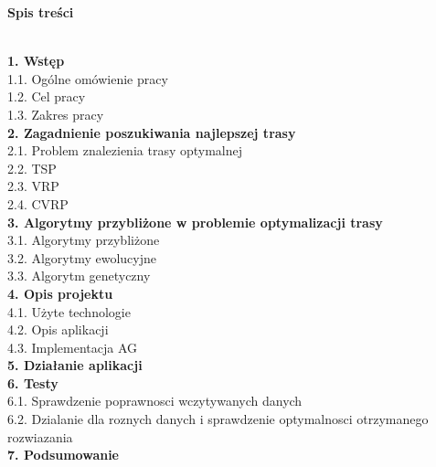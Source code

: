 \documentclass[a4paper, twoside, 12pt, justified]{article}
\begin{document}
	\begin{flushleft}
		\begin{large}\textbf{Spis treści}\end{large}
		\vspace{5mm}\\
		\textbf{1. Wstęp }\\
			\hspace{5mm}1.1. Ogólne omówienie pracy\\
			\hspace{5mm}1.2. Cel pracy\\
			\hspace{5mm}1.3. Zakres pracy\\
		\textbf{2. Zagadnienie poszukiwania najlepszej trasy }\\
			\hspace{5mm}2.1. Problem znalezienia trasy optymalnej\\
			\hspace{5mm}2.2. TSP\\
			\hspace{5mm}2.3. VRP\\
			\hspace{5mm}2.4. CVRP\\
		\textbf{3. Algorytmy przybliżone w problemie
			optymalizacji trasy }\\
			\hspace{5mm}3.1. Algorytmy przybliżone\\
			\hspace{5mm}3.2. Algorytmy ewolucyjne\\
			\hspace{5mm}3.3. Algorytm genetyczny\\
		\textbf{4. Opis projektu}\\
			\hspace{5mm}4.1. Użyte technologie\\
			\hspace{5mm}4.2. Opis aplikacji\\
			\hspace{5mm}4.3. Implementacja AG\\
		\textbf{5. Działanie aplikacji}\\
		\textbf{6. Testy}\\
			\hspace{5mm}6.1. Sprawdzenie poprawnosci wczytywanych danych\\
			\hspace{5mm}6.2. Dzialanie dla roznych danych i sprawdzenie optymalnosci otrzymanego rozwiazania\\
		\textbf{7. Podsumowanie}\\
		
	\end{flushleft}
	\newpage
	
\end{document}
